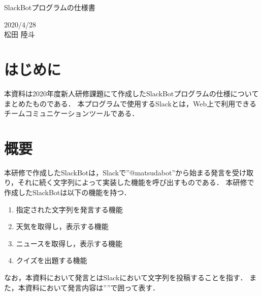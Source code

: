 \documentclass[12pt]{jsarticle}
\begin{document}
\begin{center}
{\LARGE SlackBotプログラムの仕様書}
\end{center}

\begin{flushright}
  2020/4/28\\
  松田 陸斗
\end{flushright}
\section{はじめに}
\label{sec:introduction}
本資料は2020年度新人研修課題にて作成したSlackBotプログラムの仕様についてまとめたものである．
本プログラムで使用するSlackとは，Web上で利用できるチームコミュニケーションツールである．

\section{概要}
本研修で作成したSlackBotは，Slackで''@matsudabot''から始まる発言を受け取り，それに続く文字列によって実装した機能を呼び出すものである．
本研修で作成したSlackBotは以下の機能を持つ．
\begin{enumerate}
\item 指定された文字列を発言する機能
\item 天気を取得し，表示する機能
\item ニュースを取得し，表示する機能
\item クイズを出題する機能
\end{enumerate}
なお，本資料において発言とはSlackにおいて文字列を投稿することを指す．
また，本資料において発言内容は''''で囲って表す．
\end{document}
